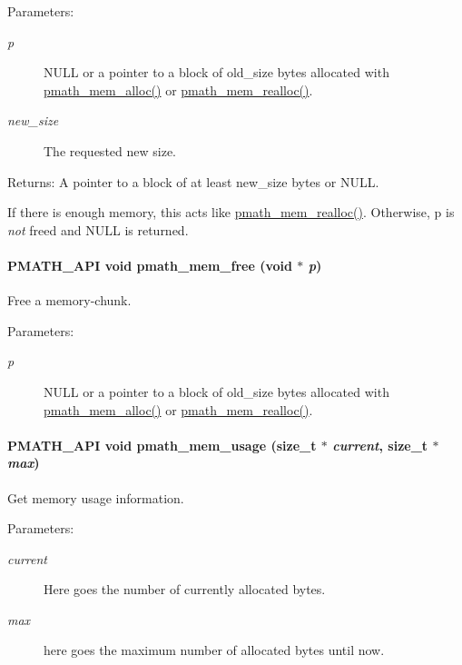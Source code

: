 \begin{Desc}
\item[Parameters:]
\begin{description}
\item[{\em p}]NULL or a pointer to a block of old\_\-size bytes allocated with \hyperlink{group__memory_g856c326c830629de5637912fa8bc2bc9}{pmath\_\-mem\_\-alloc()} or \hyperlink{group__memory_g59dc67a7de0dc3111dfb0424df8d8244}{pmath\_\-mem\_\-realloc()}. \item[{\em new\_\-size}]The requested new size. \end{description}
\end{Desc}
\begin{Desc}
\item[Returns:]A pointer to a block of at least new\_\-size bytes or NULL.\end{Desc}
If there is enough memory, this acts like \hyperlink{group__memory_g59dc67a7de0dc3111dfb0424df8d8244}{pmath\_\-mem\_\-realloc()}. Otherwise, p is {\em not\/} freed and NULL is returned. \hypertarget{group__memory_g936d3001151c35052812e597eb7dce4f}{
\paragraph[{pmath\_\-mem\_\-free}]{\setlength{\rightskip}{0pt plus 5cm}PMATH\_\-API void pmath\_\-mem\_\-free (void $\ast$ {\em p})}\hfill}
\label{group__memory_g936d3001151c35052812e597eb7dce4f}


Free a memory-chunk. 

\begin{Desc}
\item[Parameters:]
\begin{description}
\item[{\em p}]NULL or a pointer to a block of old\_\-size bytes allocated with \hyperlink{group__memory_g856c326c830629de5637912fa8bc2bc9}{pmath\_\-mem\_\-alloc()} or \hyperlink{group__memory_g59dc67a7de0dc3111dfb0424df8d8244}{pmath\_\-mem\_\-realloc()}. \end{description}
\end{Desc}
\hypertarget{group__memory_gfabd51edae8c23c11efdc4540d7b6a0d}{
\paragraph[{pmath\_\-mem\_\-usage}]{\setlength{\rightskip}{0pt plus 5cm}PMATH\_\-API void pmath\_\-mem\_\-usage (size\_\-t $\ast$ {\em current}, \/  size\_\-t $\ast$ {\em max})}\hfill}
\label{group__memory_gfabd51edae8c23c11efdc4540d7b6a0d}


Get memory usage information. 

\begin{Desc}
\item[Parameters:]
\begin{description}
\item[{\em current}]Here goes the number of currently allocated bytes. \item[{\em max}]here goes the maximum number of allocated bytes until now. \end{description}
\end{Desc}
